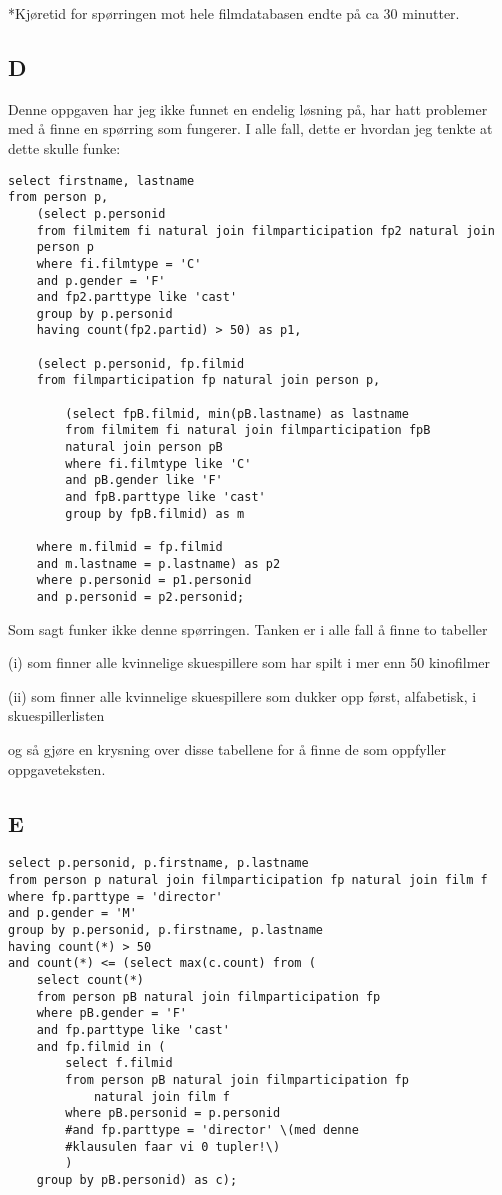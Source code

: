 \documentclass[12pt,norsk,a4paper]{article}
\begin{document}
*Kjøretid for spørringen mot hele filmdatabasen endte på ca 30 minutter.

\subsection*{D}
Denne oppgaven har jeg ikke funnet en endelig løsning på, har hatt problemer med å finne en spørring som fungerer. I alle fall, dette er hvordan jeg tenkte at dette skulle funke:

\begin{lstlisting}
select firstname, lastname
from person p,
	(select p.personid
	from filmitem fi natural join filmparticipation fp2 natural join
	person p 
	where fi.filmtype = 'C'
	and p.gender = 'F'
	and fp2.parttype like 'cast'
	group by p.personid
	having count(fp2.partid) > 50) as p1,

	(select p.personid, fp.filmid
	from filmparticipation fp natural join person p,

		(select fpB.filmid, min(pB.lastname) as lastname
		from filmitem fi natural join filmparticipation fpB 
		natural join person pB
		where fi.filmtype like 'C'
		and pB.gender like 'F'
		and fpB.parttype like 'cast'
		group by fpB.filmid) as m

	where m.filmid = fp.filmid
	and m.lastname = p.lastname) as p2
	where p.personid = p1.personid
	and p.personid = p2.personid;
\end{lstlisting}

Som sagt funker ikke denne spørringen. Tanken er i alle fall å finne to tabeller

(i) som finner alle kvinnelige skuespillere som har spilt i mer enn 50 kinofilmer

(ii) som finner alle kvinnelige skuespillere som dukker opp først, alfabetisk, i skuespillerlisten

og så gjøre en krysning over disse tabellene for å finne de som oppfyller oppgaveteksten.

\subsection*{E}
\begin{lstlisting}
select p.personid, p.firstname, p.lastname
from person p natural join filmparticipation fp natural join film f
where fp.parttype = 'director'
and p.gender = 'M'
group by p.personid, p.firstname, p.lastname
having count(*) > 50
and count(*) <= (select max(c.count) from (
	select count(*)
	from person pB natural join filmparticipation fp
	where pB.gender = 'F'
	and fp.parttype like 'cast'
	and fp.filmid in (
		select f.filmid
		from person pB natural join filmparticipation fp 
			natural join film f
		where pB.personid = p.personid
		#and fp.parttype = 'director' \(med denne 
		#klausulen faar vi 0 tupler!\)
		)
	group by pB.personid) as c);
\end{lstlisting}
\end{document}
